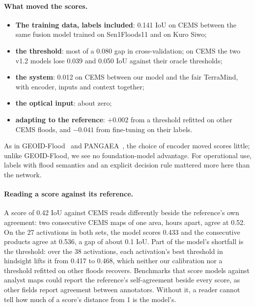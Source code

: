 \documentclass[10pt,twocolumn,a4paper]{article}
\begin{document}
\paragraph{What moved the scores.}
\begin{itemize}
  \item \textbf{The training data, labels included}: 0.141 IoU on CEMS between the same fusion model trained on
    Sen1Floods11 and on Kuro Siwo;
  \item \textbf{the threshold}: most of a 0.080 gap in cross-validation; on CEMS the two v1.2 models lose 0.039 and
    0.050 IoU against their oracle thresholds;
  \item \textbf{the system}: 0.012 on CEMS between our model and the fair TerraMind, with encoder, inputs and
    context together;
  \item \textbf{the optical input}: about zero;
  \item \textbf{adapting to the reference}: $+0.002$ from a threshold refitted on other CEMS floods, and $-0.041$ from
    fine-tuning on their labels.
\end{itemize}
As in GEOID-Flood~\citep{chiriaco2026geoid} and PANGAEA~\citep{marsocci2024pangaea}, the choice of encoder moved
scores little; unlike GEOID-Flood, we see no foundation-model advantage. For operational use, labels with flood
semantics and an explicit decision rule mattered more here than the network.

\paragraph{Reading a score against its reference.} A score of 0.42 IoU against CEMS reads differently beside the
reference's own agreement: two consecutive CEMS maps of one area, hours apart, agree at 0.52. On the 27 activations
in both sets, the model scores 0.433 and the consecutive products agree at 0.536, a gap of about 0.1 IoU. Part of the
model's shortfall is the threshold: over the 38 activations, each activation's best threshold in hindsight lifts it
from 0.417 to 0.468, which neither our calibration nor a threshold refitted on other floods recovers.
Benchmarks that score models against analyst maps could report the reference's self-agreement beside every score,
as other fields report agreement between annotators. Without it, a reader cannot tell how much of a score's distance
from 1 is the model's.
\end{document}
